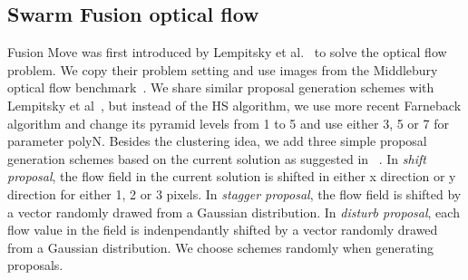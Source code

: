 \subsection{Swarm Fusion optical flow}

Fusion Move was first introduced by Lempitsky et al.~\cite{fusion_flow} to
solve the optical flow problem.
We copy their problem setting and use images from the Middlebury optical flow
benchmark~\cite{middlebury_optical_flow}. We share similar proposal generation schemes with Lempitsky et al~\cite{fusion_flow}, but instead of the HS algorithm, we use more recent Farneback algorithm and change its pyramid levels from 1 to 5 and use either 3, 5 or 7 for parameter polyN. Besides the clustering idea, we add three simple proposal generation schemes based on the current solution as suggested in ~\cite{fusion_flow}. In \textit{shift proposal}, the flow field in the current solution is shifted in either x direction or y direction for either 1, 2 or 3 pixels. In \textit{stagger proposal}, the flow field is shifted by a vector randomly drawed from a Gaussian distribution. In \textit{disturb proposal}, each flow value in the field is indenpendantly shifted by a vector randomly drawed from a Gaussian distribution. We choose schemes randomly when generating proposals.


